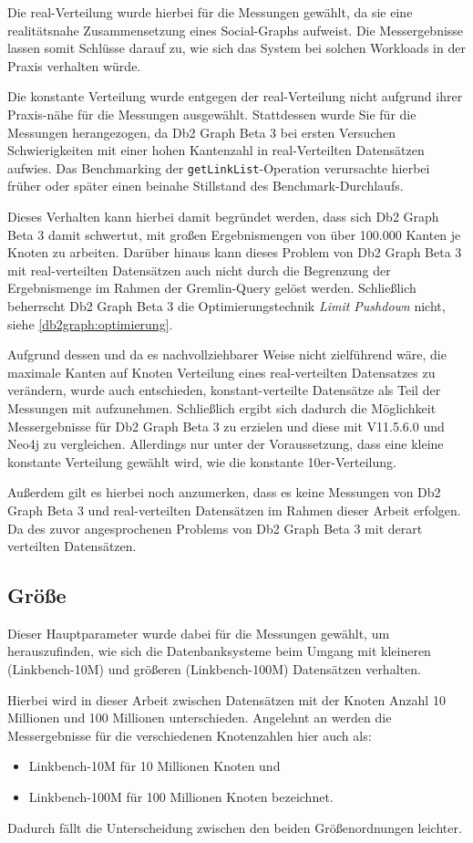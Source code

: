 Die real-Verteilung wurde hierbei für die Messungen gewählt, da sie eine realitätsnahe Zusammensetzung eines Social-Graphs aufweist. Die Messergebnisse lassen somit Schlüsse darauf zu, wie sich das System bei solchen Workloads in der Praxis verhalten würde.

Die konstante Verteilung wurde entgegen der real-Verteilung nicht aufgrund ihrer Praxis-nähe für die Messungen ausgewählt. Stattdessen wurde Sie für die Messungen herangezogen, da Db2 Graph Beta 3 bei ersten Versuchen Schwierigkeiten mit einer hohen Kantenzahl in real-Verteilten Datensätzen aufwies. Das Benchmarking der \texttt{getLinkList}-Operation verursachte hierbei früher oder später einen beinahe Stillstand des Benchmark-Durchlaufs. 

Dieses Verhalten kann hierbei damit begründet werden, dass sich Db2 Graph Beta 3 damit schwertut, mit großen Ergebnismengen von über 100.000 Kanten je Knoten zu arbeiten. Darüber hinaus kann dieses Problem von Db2 Graph Beta 3 mit real-verteilten Datensätzen auch nicht durch die Begrenzung der Ergebnismenge im Rahmen der Gremlin-Query gelöst werden. Schließlich beherrscht Db2 Graph Beta 3 die Optimierungstechnik \textit{Limit Pushdown} nicht, siehe \autoref{db2graph:optimierung}. 

Aufgrund dessen und da es nachvollziehbarer Weise nicht zielführend wäre, die maximale Kanten auf Knoten Verteilung eines real-verteilten Datensatzes zu verändern, wurde auch entschieden, konstant-verteilte Datensätze als Teil der Messungen mit aufzunehmen. Schließlich ergibt sich dadurch die Möglichkeit Messergebnisse für Db2 Graph Beta 3 zu erzielen und diese mit V11.5.6.0 und Neo4j zu vergleichen. Allerdings nur unter der Voraussetzung, dass eine kleine konstante Verteilung gewählt wird, wie die konstante 10er-Verteilung. 

Außerdem gilt es hierbei noch anzumerken, dass es keine Messungen von Db2 Graph Beta 3 und real-verteilten Datensätzen im Rahmen dieser Arbeit erfolgen. Da des zuvor angesprochenen Problems von Db2 Graph Beta 3 mit derart verteilten Datensätzen.

\subsection{Größe}
Dieser Hauptparameter wurde dabei für die Messungen gewählt, um herauszufinden, wie sich die Datenbanksysteme beim Umgang mit kleineren (Linkbench-10M) und größeren (Linkbench-100M) Datensätzen verhalten. 

Hierbei wird in dieser Arbeit zwischen Datensätzen mit der Knoten Anzahl 10 Millionen und 100 Millionen unterschieden. Angelehnt an \cite{sigmod_tian} werden die Messergebnisse für die verschiedenen Knotenzahlen hier auch als:
\begin{itemize}
    \item Linkbench-10M für 10 Millionen Knoten und 
    \item Linkbench-100M für 100 Millionen Knoten bezeichnet.
\end{itemize}
Dadurch fällt die Unterscheidung zwischen den beiden Größenordnungen leichter. 

